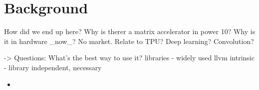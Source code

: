 \documentclass[\main/thesis.tex]{subfiles}
\begin{document}
\chapter{Background}
\label{cha:background}

How did we end up here?
Why is therer a matrix accelerator in power 10?
Why is it in hardware \_now\_? No market.
Relate to TPU? Deep learning? Convolution?

-> Questions:
  What's the best way to use it?
    libraries - widely used
    llvm intrinsic - library independent, necessary
\begin{itemize}
  \item
\end{itemize}
\end{document}
